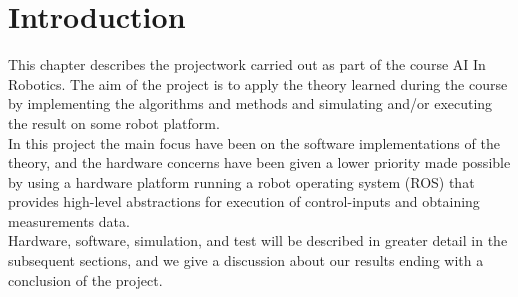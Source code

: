 
\section{Introduction} %
\label{sec:prokect_introduction}

This chapter describes the projectwork carried out as part of the course AI In Robotics. The aim of the project is to apply the theory learned during the course by implementing the algorithms and methods and simulating and/or executing the result on some robot platform.\\
In this project the main focus have been on the software implementations of the theory, and the hardware concerns have been given a lower priority made possible by using a hardware platform running a robot operating system (ROS) that provides high-level abstractions for execution of control-inputs and obtaining measurements data.\\

Hardware, software, simulation, and test will be described in greater detail in the subsequent sections, and we give a discussion about our results ending with a conclusion of the project.

